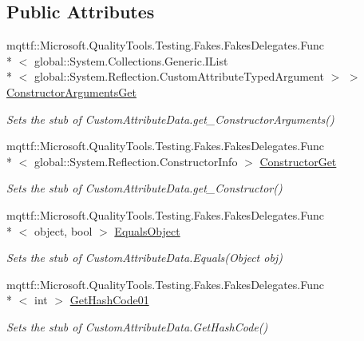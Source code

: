 \subsection*{Public Attributes}
\begin{DoxyCompactItemize}
\item 
mqttf\-::\-Microsoft.\-Quality\-Tools.\-Testing.\-Fakes.\-Fakes\-Delegates.\-Func\\*
$<$ global\-::\-System.\-Collections.\-Generic.\-I\-List\\*
$<$ global\-::\-System.\-Reflection.\-Custom\-Attribute\-Typed\-Argument $>$ $>$ \hyperlink{class_system_1_1_reflection_1_1_fakes_1_1_stub_custom_attribute_data_a0ed3ef8ec611a2a2f28fde4aa104c778}{Constructor\-Arguments\-Get}
\begin{DoxyCompactList}\small\item\em Sets the stub of Custom\-Attribute\-Data.\-get\-\_\-\-Constructor\-Arguments()\end{DoxyCompactList}\item 
mqttf\-::\-Microsoft.\-Quality\-Tools.\-Testing.\-Fakes.\-Fakes\-Delegates.\-Func\\*
$<$ global\-::\-System.\-Reflection.\-Constructor\-Info $>$ \hyperlink{class_system_1_1_reflection_1_1_fakes_1_1_stub_custom_attribute_data_af16200d66ee56933559022459f2dca6a}{Constructor\-Get}
\begin{DoxyCompactList}\small\item\em Sets the stub of Custom\-Attribute\-Data.\-get\-\_\-\-Constructor()\end{DoxyCompactList}\item 
mqttf\-::\-Microsoft.\-Quality\-Tools.\-Testing.\-Fakes.\-Fakes\-Delegates.\-Func\\*
$<$ object, bool $>$ \hyperlink{class_system_1_1_reflection_1_1_fakes_1_1_stub_custom_attribute_data_a1d6da7cba62ad409929160378acc9ef3}{Equals\-Object}
\begin{DoxyCompactList}\small\item\em Sets the stub of Custom\-Attribute\-Data.\-Equals(\-Object obj)\end{DoxyCompactList}\item 
mqttf\-::\-Microsoft.\-Quality\-Tools.\-Testing.\-Fakes.\-Fakes\-Delegates.\-Func\\*
$<$ int $>$ \hyperlink{class_system_1_1_reflection_1_1_fakes_1_1_stub_custom_attribute_data_a003ffb3e791fd9fe297215212525081c}{Get\-Hash\-Code01}
\begin{DoxyCompactList}\small\item\em Sets the stub of Custom\-Attribute\-Data.\-Get\-Hash\-Code()\end{DoxyCompactList}\item 

\end{DoxyCompactItemize}
